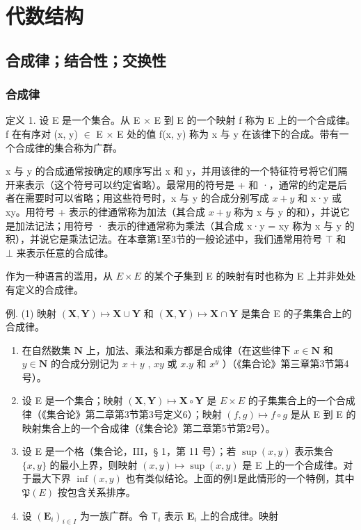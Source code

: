 \chapter{代数结构}

\section{合成律；结合性；交换性}

\subsection{合成律}

定义 1. 设 E 是一个集合。从 E × E 到 E 的一个映射 f 称为 E 上的一个合成律。f 在有序对 (x, y) \ensuremath{\in} E × E 处的值 f(x, y) 称为 x 与 y 在该律下的合成。带有一个合成律的集合称为广群。

x 与 y 的合成通常按确定的顺序写出 x 和 y，并用该律的一个特征符号将它们隔开来表示（这个符号可以约定省略）。最常用的符号是 + 和 ·，通常的约定是后者在需要时可以省略；用这些符号时，x 与 y 的合成分别写成 \(x + y\) 和 x·y 或 xy。用符号 + 表示的律通常称为加法（其合成 \(x + y\) 称为 x 与 y 的和），并说它是加法记法；用符号 · 表示的律通常称为乘法（其合成 x·y = xy 称为 x 与 y 的积），并说它是乘法记法。在本章第1至3节的一般论述中，我们通常用符号 \(\top\) 和 \(\bot\) 来表示任意的合成律。

作为一种语言的滥用，从 \(E \times E\) 的某个子集到 E 的映射有时也称为 E 上并非处处有定义的合成律。

例. (1) 映射 \((\mathbf{X},\mathbf{Y})\mapsto \mathbf{X}\cup \mathbf{Y}\) 和 \((\mathbf{X},\mathbf{Y})\mapsto \mathbf{X}\cap \mathbf{Y}\) 是集合 E 的子集集合上的合成律。

\begin{enumerate}
\def\labelenumi{(\arabic{enumi})}
\setcounter{enumi}{1}
\item
  在自然数集 \(\mathbf{N}\) 上，加法、乘法和乘方都是合成律（在这些律下 \(x \in \mathbf{N}\) 和 \(y \in \mathbf{N}\) 的合成分别记为 \(x + y\) , \(xy\) 或 \(x.y\) 和 \(x^y\) ）（《集合论》第三章第3节第4号）。
\item
  设 E 是一个集合；映射 \((\mathbf{X}, \mathbf{Y}) \mapsto \mathbf{X} \circ \mathbf{Y}\) 是 \(E \times E\) 的子集集合上的一个合成律（《集合论》第二章第3节第3号定义6）；映射 \((f, g) \mapsto f \circ g\) 是从 E 到 E 的映射集合上的一个合成律（《集合论》第二章第5节第2号）。
\item
  设 E 是一个格（集合论，III，§ 1，第 11 号）；若 \(\sup(x, y)\) 表示集合 \(\{x, y\}\) 的最小上界，则映射 \((x, y) \mapsto \sup(x, y)\) 是 E 上的一个合成律。对于最大下界 \(\inf(x, y)\) 也有类似结论。上面的例1是此情形的一个特例，其中 \(\mathfrak{P}(E)\) 按包含关系排序。
\item
  设 \((\mathbf{E}_i)_{i\in I}\) 为一族广群。令 \(\mathsf{T}_i\) 表示 \(\mathbf{E}_i\) 上的合成律。映射
\end{enumerate}

